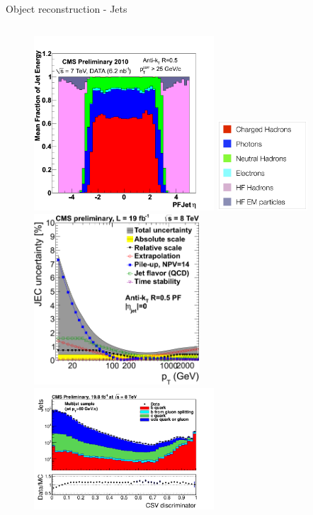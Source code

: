 \begin{frame}{Object reconstruction - Jets}
\begin{columns}
\begin{column}{.45\textwidth}
\begin{figure}[!Hhtbp]
\begin{center}
\includegraphics[width=0.6\textwidth,height=0.33\textheight]{../figs/Jet_composition_data_7TeV.png}
\includegraphics[width=0.3\textwidth]{../figs/Legend_jet_composition.png}\\
\includegraphics[width=0.55\textwidth,height=0.33\textheight]{../figs/JEC_pt.png}\\
\includegraphics[width=0.6\textwidth,height=0.33\textheight]{../figs/pdf-sub.png}
\end{center}
\end{figure}
\end{column}
\end{columns}

\end{frame}

\fi